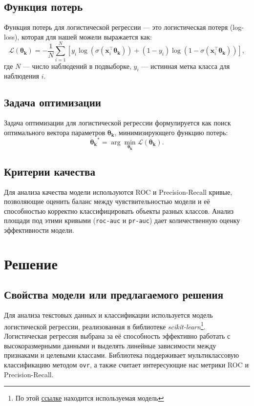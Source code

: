 \documentclass{article}
\begin{document}
\subsection{Функция потерь}

Функция потерь для логистической регрессии --- это логистическая потеря (log-loss), которая для нашей можели выражается как:
\begin{equation}
    \mathcal{L}(\boldsymbol{\theta_k}) = -\frac{1}{N} \sum_{i=1}^{N} \left[ y_i \log(\sigma(\mathbf{x}_i^\top \boldsymbol{\theta_k})) + (1 - y_i) \log(1 - \sigma(\mathbf{x}_i^\top \boldsymbol{\theta_k})) \right],
\end{equation}
где $N$ --- число наблюдений в подвыборке, $y_i$ --- истинная метка класса для наблюдения $i$.

\subsection{Задача оптимизации}

Задача оптимизации для логистической регрессии формулируется как поиск оптимального вектора параметров $\boldsymbol{\theta_k}$, минимизирующего функцию потерь:
\begin{equation}
    \boldsymbol{\theta_k}^* = \arg\min_{\boldsymbol{\theta_k}} \mathcal{L}(\boldsymbol{\theta_k}).
\end{equation}


\subsection{Критерии качества}

Для анализа качества модели используются ROC\cite{fawcett2006introduction} и Precision-Recall\cite{amigo2018general} кривые, позволяющие оценить баланс между чувствительностью модели и её способностью корректно классифицировать объекты разных классов. Анализ площади под этими кривыми (\texttt{roc-auc} и \texttt{pr-auc}) дает количественную оценку эффективности модели.


\section{Решение}
\subsection{Свойства модели или предлагаемого решения}

Для анализа текстовых данных и классификации используется модель логистической регрессии, реализованная в библиотеке \textit{scikit-learn}\footnote{По этой \href{https://scikit-learn.org/stable/modules/generated/sklearn.linear_model.LogisticRegression.html}{ссылке} находится используемая модель}. Логистическая регрессия выбрана за её способность эффективно работать с высокоразмерными данными и выделять линейные зависимости между признаками и целевыми классами. Библиотека поддерживает мультиклассовую классификацию методом \texttt{ovr}, а также считает интересующие нас метрики ROC и Precision-Recall.
\end{document}
